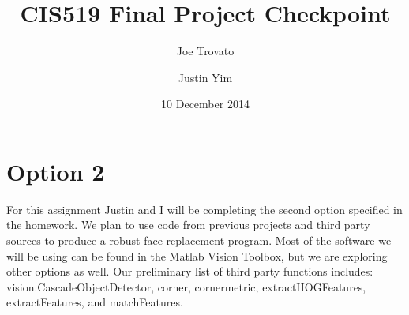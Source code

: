 \documentclass{article}
\begin{document}
\title{CIS519 Final Project Checkpoint}
\author{Joe Trovato \and Justin Yim}
\date{10 December 2014}
\maketitle

\section{Option 2}
For this assignment Justin and I will be completing the second option specified in the homework. We plan to use code from previous projects and third party sources to produce a robust face replacement program. Most of the software we will be using can be found in the Matlab Vision Toolbox, but we are exploring other options as well. Our preliminary list of third party functions includes: vision.CascadeObjectDetector, corner, cornermetric, extractHOGFeatures, extractFeatures, and matchFeatures.
\end{document}

